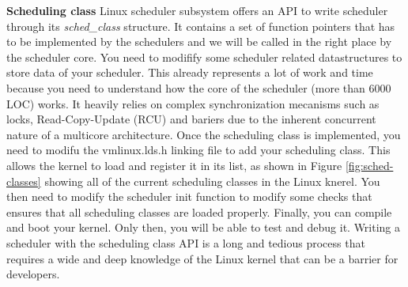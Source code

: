 \textbf{Scheduling class} Linux scheduler subsystem offers an API to write scheduler through its \textit{sched\_class} structure. It contains a set of function pointers that has to be implemented by the schedulers and we will be called in the right place by the scheduler core. You need to modifify some scheduler related datastructures to store data of your scheduler. This already represents a lot of work and time because you need to understand how the core of the scheduler (more than 6000 LOC) works. It heavily relies on complex synchronization mecanisms such as locks, Read-Copy-Update (RCU) and bariers due to the inherent concurrent nature of a multicore architecture. Once the scheduling class is implemented, you need to modifu the vmlinux.lds.h linking file to add your scheduling class. This allows the kernel to load and register it in its list, as shown in Figure \ref{fig:sched-classes} showing all of the current scheduling classes in the Linux knerel. You then need to modify the scheduler init function to modify some checks that ensures that all scheduling classes are loaded properly. Finally, you can compile and boot your kernel. Only then, you will be able to test and debug it. Writing a scheduler with the scheduling class API is a long and tedious process that requires a wide and deep knowledge of the Linux kernel that can be a barrier for developers.\\

